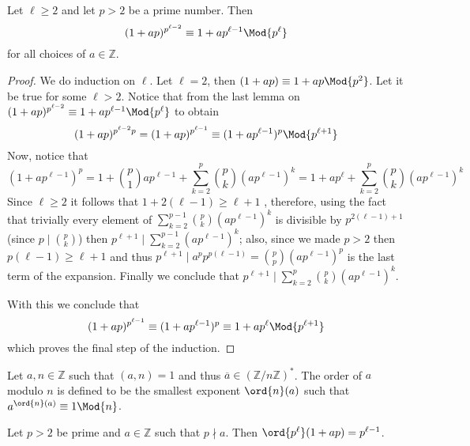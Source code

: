 \begin{corollary}
    Let \(\ell \geqslant 2\) and let \(p > 2\) be a prime number. Then
    \[
        (1+ap)^{p^{\ell-2}} \equiv 1 + a p^{\ell-1} \Mod{p^\ell}
    \]
    for all choices of \(a \in \mathbb{Z}\).
\end{corollary}

\begin{proof}
    We do induction on \(\ell\). Let  \(\ell = 2\), then  \((1 + ap) \equiv 1 +
    ap \Mod{p^2}\). Let it be true for some \(\ell > 2\). Notice that from the
    last lemma on \((1+ap)^{p^{\ell-2}} \equiv 1 + ap^{\ell-1} \Mod{p^\ell}\) to
    obtain
    \[
        (1+ap)^{p^{\ell-2}p} = (1 + ap)^{p^{\ell-1}} \equiv (1 +
        ap^{\ell-1})^p \Mod{p^{\ell+1}}
    \]
    Now, notice that
    \[
        (1 + ap^{\ell-1})^{p}
        = 1 + \binom{p}{1} ap^{\ell-1} + \sum_{k=2}^p \binom{p}{k} (ap^{\ell-1})^{k}
        = 1 + ap^{\ell} + \sum_{k=2}^{p} \binom{p}{k} (ap^{\ell-1})^k
    \]
    Since \(\ell \geqslant 2\) it follows that  \(1 + 2(\ell - 1) \geqslant
    \ell + 1\) , therefore, using the fact that trivially every element of
    \(\sum_{k=2}^{p-1} \binom{p}{k} (ap^{\ell-1})^k\) is divisible by \(p^{2(\ell
            - 1) + 1}\) (since \(p \mid \binom{p}{k}\)) then \(p^{\ell + 1} \mid
    \sum_{k=2}^{p-1} (ap^{\ell-1})^k\); also, since we made \(p > 2\) then
    \(p(\ell-1) \geqslant \ell+1\) and thus \(p^{\ell+1} \mid a^p p^{p(\ell-1)} =
    \binom{p}{p} (ap^{\ell-1})^p\) is the last term of the expansion. Finally we
    conclude that \(p^{\ell+1} \mid \sum_{k=2}^p \binom{p}{k} (a p^{\ell-1})^k\).

    With this we conclude that
    \[
        (1 + ap)^{p^{\ell-1}} \equiv (1 + ap^{\ell-1})^p \equiv 1 + ap^\ell
        \Mod{p^{\ell+1}}
    \]
    which proves the final step of the induction.
\end{proof}

\begin{definition}[Order]
    Let \(a, n \in \mathbb{Z}\) such that \((a, n) = 1\) and thus  \(\overline{a}
    \in (\mathbb{Z}/n\mathbb{Z})^\ast\). The order of \(a\) modulo \(n\) is
    defined to be the smallest exponent  \(\ord{n}(a)\) such that
    \(a^{\ord{n}(a)} \equiv 1 \Mod{n}\).
\end{definition}

\begin{corollary}\label{cor2Cyclic}
    Let \(p > 2\) be prime and \(a \in \mathbb{Z}\) such that \(p \nmid a\). Then
    \(\ord{p^\ell}(1+ap) = p^{\ell-1}\).
\end{corollary}

